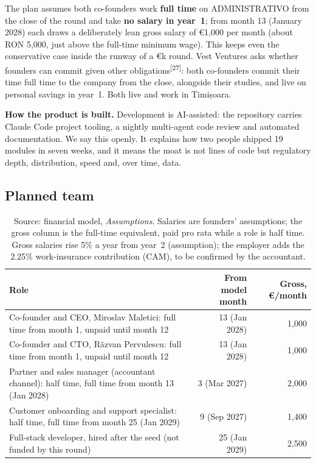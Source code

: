 \documentclass[10pt,a4paper]{article}
\newcommand{\src}[1]{\textsuperscript{\textcolor{brandSlate}{[#1]}}}
\begin{document}
The plan assumes both co-founders work \textbf{full time} on ADMINISTRATIVO from the close of
the round and take \textbf{no salary in year~1}; from month 13 (January 2028) each draws a
deliberately lean gross salary of €1,000 per month (about RON 5,000, just above the full-time
minimum wage). This keeps even the conservative case inside the runway of a
€k round. Vest Ventures asks whether founders can commit given other
obligations\src{27}: both co-founders commit their time full time to the company from the close,
alongside their studies, and live on personal savings in year~1. Both live and work in Timișoara.

\textbf{How the product is built.} Development is AI-assisted: the repository carries Claude
Code project tooling, a nightly multi-agent code review and automated documentation. We say
this openly. It explains how two people shipped 19 modules in seven weeks, and it means the
moat is not lines of code but regulatory depth, distribution, speed and, over time, data.

\subsection{Planned team}

\begin{table}[H]
\centering\small
\begin{tabularx}{0.9\linewidth}{@{}Lrr@{}}
\toprule
\textbf{Role} & \textbf{From model month} & \textbf{Gross, €/month} \\
\midrule
Co-founder and CEO, Miroslav Maletici: full time from month 1, unpaid until month 12 & 13 (Jan 2028) & 1,000 \\
Co-founder and CTO, Răzvan Pervulescu: full time from month 1, unpaid until month 12 & 13 (Jan 2028) & 1,000 \\
Partner and sales manager (accountant channel): half time, full time from month 13 (Jan 2028) & 3 (Mar 2027) & 2,000 \\
Customer onboarding and support specialist: half time, full time from month 25 (Jan 2029) & 9 (Sep 2027) & 1,400 \\
Full-stack developer, hired after the seed (not funded by this round) & 25 (Jan 2029) & 2,500 \\
\bottomrule
\end{tabularx}
\caption*{\footnotesize\color{brandSlate}Source: financial model, \textit{Assumptions}. Salaries
are founders' assumptions; the gross column is the full-time equivalent, paid pro rata while a role
is half time. Gross salaries rise 5\% a year from year~2 (assumption); the employer
adds the 2.25\% work-insurance contribution (CAM), to be confirmed by the accountant.}
\end{table}
\end{document}
